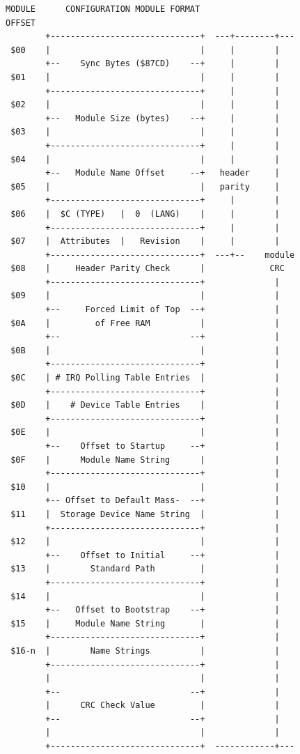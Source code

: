 \documentclass[
]{article}
\begin{document}
\begin{figure}
\centering
\begin{verbatim}
MODULE      CONFIGURATION MODULE FORMAT
OFFSET
        +------------------------------+  ---+--------+---
 $00    |                              |     |        |
        +--    Sync Bytes ($87CD)    --+     |        |
 $01    |                              |     |        |
        +------------------------------+     |        |
 $02    |                              |     |        |
        +--   Module Size (bytes)    --+     |        |
 $03    |                              |     |        |
        +------------------------------+     |        |
 $04    |                              |     |        |
        +--   Module Name Offset     --+   header     |
 $05    |                              |   parity     |
        +------------------------------+     |        |
 $06    |  $C (TYPE)   |  0  (LANG)    |     |        |
        +------------------------------+     |        |
 $07    |  Attributes  |   Revision    |     |        |
        +------------------------------+  ---+--    module
 $08    |     Header Parity Check      |             CRC
        +------------------------------+              |
 $09    |                              |              |
        +--     Forced Limit of Top  --+              |
 $0A    |         of Free RAM          |              |
        +--                          --+              |
 $0B    |                              |              |
        +------------------------------+              |
 $0C    | # IRQ Polling Table Entries  |              |
        +------------------------------+              |
 $0D    |    # Device Table Entries    |              |
        +------------------------------+              |
 $0E    |                              |              |
        +--    Offset to Startup     --+              |
 $0F    |      Module Name String      |              |
        +------------------------------+              |
 $10    |                              |              |
        +-- Offset to Default Mass-  --+              |
 $11    |  Storage Device Name String  |              |
        +------------------------------+              |
 $12    |                              |              |
        +--    Offset to Initial     --+              |
 $13    |        Standard Path         |              |
        +------------------------------+              |
 $14    |                              |              |
        +--   Offset to Bootstrap    --+              |
 $15    |     Module Name String       |              |
        +------------------------------+              |
 $16-n  |        Name Strings          |              |
        +------------------------------+              |
        |                              |              |
        +--                          --+              |
        |      CRC Check Value         |              |
        +--                          --+              |
        |                              |              |
        +------------------------------+  ------------+---
\end{verbatim}
\caption{}
\end{figure}
\end{document}
